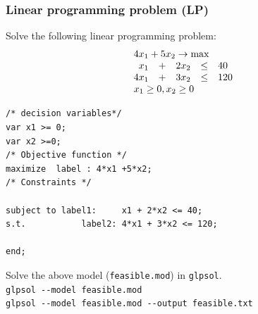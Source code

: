 \documentclass[landscape]{beamer}
\begin{document}
\begin{frame}[fragile]
  \frametitle{Linear programming problem (LP)}
\begin{small}
Solve the following linear programming problem:
\[
\begin{array}{rcrlll} 
               \multicolumn{5}{l}{4x_1+5x_2\rightarrow \max}\\ 
                                            x_1&+&2x_2&\leq &40\\
                                            4x_1&+&3x_2&\leq &120 \\ 
                                 \multicolumn{5}{l}{x_1   \geq  0, x_2 \geq 0} 
\end{array}
\]
\end{small}
\vspace{-0.8cm}
\begin{tiny}
\begin{verbatim}
/* decision variables*/
var x1 >= 0;
var x2 >=0;
/* Objective function */
maximize  label : 4*x1 +5*x2;
/* Constraints */

subject to label1:     x1 + 2*x2 <= 40;
s.t.           label2: 4*x1 + 3*x2 <= 120; 

end;
\end{verbatim}
\end{tiny}
\begin{small}
Solve the above model (\texttt{feasible.mod}) in \texttt{glpsol}.\\
\verb=glpsol --model feasible.mod=\\
\verb=glpsol --model feasible.mod --output feasible.txt=
\end{small}

\end{frame}
\end{document}
